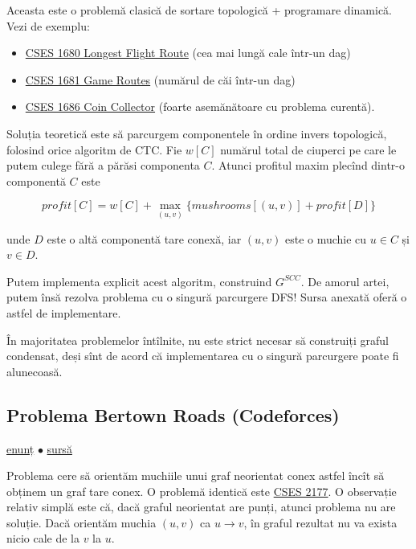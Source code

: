 \documentclass[../main.tex]{subfiles}
\begin{document}
Aceasta este o problemă clasică de sortare topologică + programare dinamică. Vezi de exemplu:

\begin{itemize}
  \item \href{https://cses.fi/problemset/task/1680}{CSES 1680 Longest Flight Route} (cea mai lungă cale într-un dag)
  \item \href{https://cses.fi/problemset/task/1681}{CSES 1681 Game Routes} (numărul de căi într-un dag)
  \item \href{https://cses.fi/problemset/task/1686}{CSES 1686 Coin Collector} (foarte asemănătoare cu problema curentă).
\end{itemize}

Soluția teoretică este să parcurgem componentele în ordine invers topologică, folosind orice algoritm de CTC. Fie $w[C]$ numărul total de ciuperci pe care le putem culege fără a părăsi componenta $C$. Atunci profitul maxim plecînd dintr-o componentă $C$ este

$$profit[C] = w[C] + \max_{(u,v)} \{ mushrooms[(u,v)] + profit[D] \}$$

unde $D$ este o altă componentă tare conexă, iar $(u,v)$ este o muchie cu $u \in C$ și $v \in D$.

Putem implementa explicit acest algoritm, construind $G^{SCC}$. De amorul artei, putem însă rezolva problema cu o singură parcurgere DFS! Sursa anexată oferă o astfel de implementare.

În majoritatea problemelor întîlnite, nu este strict necesar să construiți graful condensat, deși sînt de acord că implementarea cu o singură parcurgere poate fi alunecoasă.

\subsection{Problema Bertown Roads (Codeforces)}
\label{problem:bertown-roads}

\href{https://codeforces.com/contest/118/problem/E}{enunț}
$\bullet$
\hyperref[code:bertown-roads]{sursă}

Problema cere să orientăm muchiile unui graf neorientat conex astfel încît să obținem un graf tare conex. O problemă identică este \href{https://cses.fi/problemset/task/2177}{CSES 2177}. O observație relativ simplă este că, dacă graful neorientat are punți, atunci problema nu are soluție. Dacă orientăm muchia $(u,v)$ ca $u \to v$, în graful rezultat nu va exista nicio cale de la $v$ la $u$.
\end{document}
